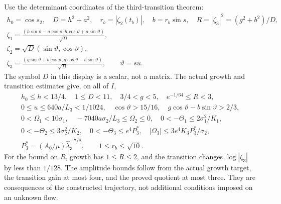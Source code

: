 Use the determinant coordinates of the third-transition theorem:
\begin{equation}\label{tts:geometry}
 \begin{gathered}
 h_0=\cos s_2,\quad D=h^2+a^2,\quad
 r_b=|\zeta_2(t_b)|,\quad b=r_b\sin s,\quad
 R=|\zeta_3|^2=(g^2+b^2)/D,\\
 \zeta_1=\frac{(h\sin\vartheta-a\cos\vartheta,
                     h\cos\vartheta+a\sin\vartheta)}{\sqrt D},\\
 \zeta_2=\sqrt D(\sin\vartheta,\cos\vartheta),\\
 \zeta_3=\frac{(g\sin\vartheta+b\cos\vartheta,
                     g\cos\vartheta-b\sin\vartheta)}{\sqrt D},
 \qquad\vartheta=su.
 \end{gathered}
\end{equation}
The symbol $D$ in this display is a scalar, not a matrix.
The actual growth and transition estimates give, on all of $I$,
\begin{equation}\label{tts:box}
 \begin{gathered}
 h_0\leq h<13/4,\quad 1\leq D<11,\quad 3/4<g<5,
 \quad e^{-1/64}\leq R<3,\\
 0\leq u\leq640a/L_3<1/1024,\quad
 \cos\vartheta>15/16,\quad
 g\cos\vartheta-b\sin\vartheta>2/3,\\
 0<\Omega_1<10\sigma_1,\quad
 -7040a\sigma_2/L_3\leq\Omega_2\leq0,\quad
 0<-\Theta_1\leq2\sigma_1^2/K_1,\\
 0<-\Theta_2\leq3\sigma_2^2/K_2,\quad
 0<-\Theta_3\leq e^4P_3^*,\quad
 |\Omega_3|\leq3e^4K_3P_3^*/\sigma_2,\\
 P_3^*=(A_0/\mu)\widehat\lambda_3^{-7/8},\qquad
 1\leq r_b\leq\sqrt{10}.
 \end{gathered}
\end{equation}
For the bound on $R$, growth has $1\leq R\leq2$, and the
transition changes $\log|\zeta_3|$ by less than $1/128$.
The amplitude bounds follow from the actual growth target, the
transition gain at most four, and the proved quotient at most three.
They are consequences of the constructed trajectory, not additional
conditions imposed on an unknown flow.

